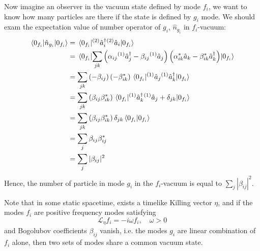 \documentclass[12pt]{article}
\numberwithin{equation}{section}
\theoremstyle{1style}
\begin{document}
Now imagine an observer in the vacuum state defined by mode \(f_i\), we want to know how many particles are there if the state is defined by \(g_i\) mode.
We should exam the expectation value of number operator of \(g_i\), \(\hat{n}_{g_i}\) in \(f_i\)-vacuum:
\begin{align}
  \expval{\hat{n}_{g_i}}{0_{f_i}} & =\expval{{}^{(2)}\hat{{a}}_i^\dagger {}^{(2)}\hat{{a}}_i}{0_{f_i}}                                                                                                     \\
                                  & =\expval{\sum_{jk}\left(\alpha_{ij}{}^{(1)}\hat{a}^{\dagger}_j-\beta_{ij}{}^{(1)}\hat{a}_j\right)\left(\alpha^*_{ik}\hat{a}_k-\beta^*_{ik}\hat{a}^{\dagger}_k\right)}{0_{f_i}} \\
                                  & =\sum_{jk}\left(-\beta_{ij}\right)\left(-\beta^*_{ik}\right)\expval{{}^{(1)}\hat{a}_j{}^{(1)}\hat{a}^{\dagger}_k}{0_{f_i}}                                                     \\
                                  & =\sum_{jk}\left(\beta_{ij}\beta^*_{ik}\right)\expval{{}^{(1)}\hat{a}^{\dagger}_k{}^{(1)}\hat{a}_j+\delta_{jk}}{0_{f_i}}                                                        \\
                                  & =\sum_{jk}\left(\beta_{ij}\beta^*_{ik}\right)\delta_{jk}\braket{0_{f_i}}{0_{f_i}}                                                                              \\
                                  & =\sum_{j}\beta_{ij}\beta^*_{ij}                                                                                                                                \\
                                  & =\sum_{j}|\beta_{ij}|^2
\end{align}
Hence, the number of particle in mode \(g_i\) in the \(f_i\)-vacuum is equal to \(\sum_{j}|\beta_{ij}|^2\).

Note that in some static spacetime, exists a timelike Killing vector \(\eta\), and if the modes \(f_i\) are positive frequency
modes satisfying
\begin{equation}
  \mathcal{L}_{\eta}f_i=-i\omega f_i,\quad \omega>0
\end{equation}
and Bogolubov coefficients \(\beta_{ij}\) vanish, i.e. the modes \(g_i\) are linear combination of \(f_i\) alone,
then two sets of modes share a common vacuum state.
\end{document}
